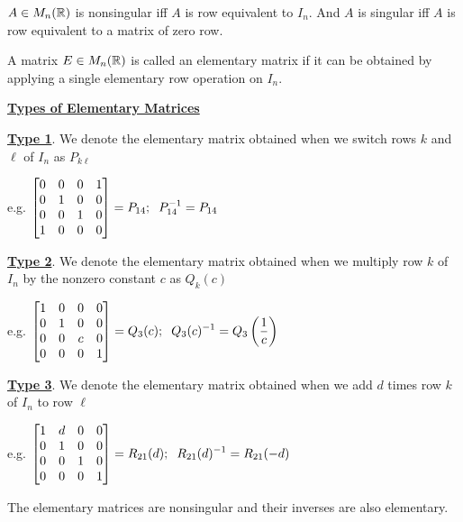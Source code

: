 \begin{remark}
$A \in M_n(\mathbb{R})$ is nonsingular iff $A$ is row equivalent to $I_n$. And $A$ is singular iff $A$ is row equivalent to a matrix of zero row.
\end{remark}

\begin{definition}
A matrix $E \in M_n(\mathbb{R})$ is called an elementary matrix if it can be obtained by applying a single elementary row operation on $I_n$.
\end{definition}

\underline{\textbf{Types of Elementary Matrices}}

\underline{\textbf{Type 1}}. We denote the elementary matrix obtained when we switch rows $k$ and $\ell$ of $I_n$ as $P_{k\ell}$

e.g. $\displaystyle \begin{bmatrix} 0 & 0 & 0 & 1 \\ 0 & 1 & 0 & 0 \\ 0 & 0 & 1 & 0 \\ 1 & 0 & 0 & 0 \end{bmatrix} = P_{14}; \hspace{0.2cm} P_{14}^{-1} = P_{14}$

\underline{\textbf{Type 2}}. We denote the elementary matrix obtained when we multiply row $k$ of $I_n$ by the nonzero constant $c$ as $Q_k(c)$

e.g. $\displaystyle \begin{bmatrix} 1 & 0 & 0 & 0 \\ 0 & 1 & 0 & 0 \\ 0 & 0 & c & 0 \\ 0 & 0 & 0 & 1 \end{bmatrix} = Q_3(c); \hspace{0.2cm} Q_3(c)^{-1} = Q_3\left(\frac{1}{c}\right)$

\newpage
\underline{\textbf{Type 3}}. We denote the elementary matrix obtained when we add $d$ times row $k$ of $I_n$ to row $\ell$

e.g. $\displaystyle \begin{bmatrix} 1 & d & 0 & 0 \\ 0 & 1 & 0 & 0 \\ 0 & 0 & 1 & 0 \\ 0 & 0 & 0 & 1 \end{bmatrix} = R_{21}(d); \hspace{0.2cm} R_{21}(d)^{-1} = R_{21}(-d)$

\lline

\begin{theorem}
The elementary matrices are nonsingular and their inverses are also elementary.
\end{theorem}


